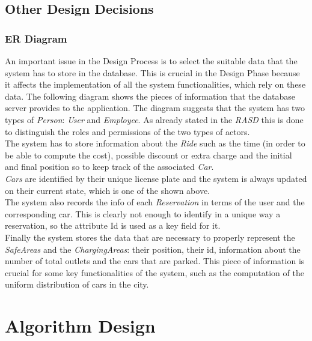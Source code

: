 \documentclass[11pt,a4paper]{report}
\begin{document}
\section{Other Design Decisions}
\subsection{ER Diagram}
An important issue in the Design Process is to select the suitable data that the system has to store in the database. This is crucial in the Design Phase because it affects the implementation of all the system functionalities, which rely on these data. The following diagram shows the pieces of information that the database server provides to the application.
\noindent The diagram suggests that the system has two types of \textit{Person}: \textit{User} and \textit{Employee}. As already stated in the \textit{RASD} this is done to distinguish the roles and permissions of the two types of actors.\\
The system has to store information about the \textit{Ride} such as the time (in order to be able to compute the cost), possible discount or extra charge and the initial and final position so to keep track of the associated \textit{Car}.\\\textit{Cars} are identified by their unique license plate and the system is always updated on their current state, which is one of the shown above.\\The system also records the info of each \textit{Reservation} in terms of the user and the corresponding car. This is clearly not enough to identify in a unique way a reservation, so the attribute Id is used as a key field for it.\\
Finally the system stores the data that are necessary to properly represent the \textit{SafeAreas} and the \textit{ChargingAreas}: their position, their id, information about the number of total outlets and the cars that are parked. This piece of information is crucial for some key functionalities of the system, such as the computation of the uniform distribution of cars in the city.

\chapter{Algorithm Design}
\end{document}
